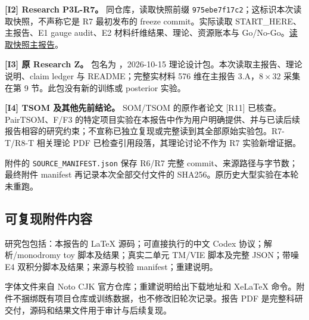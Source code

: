 \textbf{[I2] Research P3L-R7。} 同仓库，读取快照前缀 \texttt{975ebe7f17c2}；这标识本次读取快照，不声称它是 R7 最初发布的 freeze commit。实际读取 START\_HERE、主报告、E1 gauge audit、E2 材料纤维结果、理论、资源账本与 Go/No-Go。\href{https://raw.githubusercontent.com/migodam/b1-probabilistic-maxwell-imaging/975ebe7f17c2ba837a8cac0a5f8eb4ccf7d4e19b/research/p3l_r7_material_solution_fibers/RESEARCH_REPORT_ZH.md}{读取快照主报告}。

\textbf{[I3] 原 Research Z。} 包名为\newline
{}，2026-10-15 理论设计包。本次读取主报告、理论说明、claim ledger 与 README；完整实材料 576 维在主报告 3.A，$8\times32$ 采集在第 9 节。此包没有新的训练或 posterior 实验。

\textbf{[I4] TSOM 及其他先前结论。} SOM/TSOM 的原作者论文 [R11] 已核查。PairTSOM、F/F3 的特定项目实验在本报告中作为用户明确提供、并与已读后续报告相容的研究约束；不宣称已独立复现或完整读到其全部原始实验包。R7-T/R8-T 相关理论 PDF 已检查引用段落，其理论讨论不作为 R7 实验新增证据。

附件的 \texttt{SOURCE\_MANIFEST.json} 保存 R6/R7 完整 commit、来源路径与字节数；最终附件 manifest 再记录本次全部交付文件的 SHA256。原历史大型实验在本轮未重跑。

\subsection{可复现附件内容}

研究包包括：本报告的 LaTeX 源码；可直接执行的中文 Codex 协议；解析/monodromy toy 脚本及结果；真实二单元 TM/VIE 脚本及完整 JSON；带噪 E4 双积分脚本及结果；来源与校验 manifest；重建说明。

字体文件来自 Noto CJK 官方仓库；重建说明给出下载地址和 XeLaTeX 命令。附件不捆绑既有项目仓库或训练数据，也不修改旧轮次记录。报告 PDF 是完整科研交付，源码和结果文件用于审计与后续复现。
